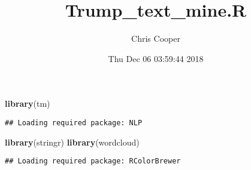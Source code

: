 \documentclass[]{article}
\title{Trump\_text\_mine.R}
\author{Chris Cooper}
\date{Thu Dec 06 03:59:44 2018}
\newenvironment{Shaded}{\begin{snugshade}}{\end{snugshade}}
\newcommand{\KeywordTok}[1]{\textcolor[rgb]{0.13,0.29,0.53}{\textbf{#1}}}
\newcommand{\NormalTok}[1]{#1}
\begin{document}
\maketitle

\begin{Shaded}
\begin{Highlighting}[]
\KeywordTok{library}\NormalTok{(tm)}
\end{Highlighting}
\end{Shaded}

\begin{verbatim}
## Loading required package: NLP
\end{verbatim}

\begin{Shaded}
\begin{Highlighting}[]
\KeywordTok{library}\NormalTok{(stringr)}
\KeywordTok{library}\NormalTok{(wordcloud)}
\end{Highlighting}
\end{Shaded}

\begin{verbatim}
## Loading required package: RColorBrewer
\end{verbatim}
\end{document}
